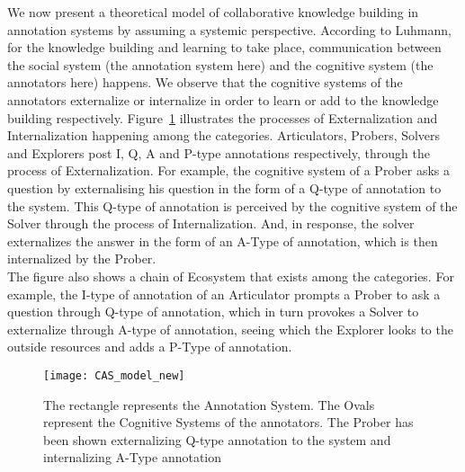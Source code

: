 \documentclass{llncs}
\begin{document}
We now present a theoretical model of collaborative knowledge building in annotation systems by assuming a systemic perspective\cite{Cress2008}. According to Luhmann, for the knowledge building and learning to take place, communication between the social system (the annotation system here) and the cognitive system (the annotators here) happens\cite{luhmann1995social}. We observe that the cognitive systems of the annotators externalize  or internalize  in order to learn or add to the knowledge building respectively. Figure~\ref{fig:model} illustrates the processes of Externalization and Internalization happening among the categories. Articulators, Probers, Solvers and Explorers post I, Q, A and P-type annotations respectively, through the process of Externalization. For example, the cognitive system of a Prober asks a question by externalising his question in the form of a Q-type of annotation to the system. This Q-type of annotation is perceived by the cognitive system of the Solver through the process of Internalization. And, in response, the solver externalizes the answer in the form of an A-Type of annotation, which is then internalized by the Prober.\\

The figure also shows a chain of Ecosystem that exists among the categories. For example, the I-type of annotation of an Articulator prompts a Prober to ask a question through Q-type of annotation, which in turn provokes a Solver to externalize through A-type of annotation, seeing which the Explorer looks to the outside resources and adds a P-Type of annotation.
\begin{figure}
\centering
\texttt{[image: CAS\_model\_new]}
\caption{The rectangle represents the Annotation System. The Ovals represent the Cognitive Systems of the annotators. The Prober has been shown externalizing Q-type annotation to the system and internalizing A-Type annotation}
\label{fig:model}
\end{figure}
\end{document}
